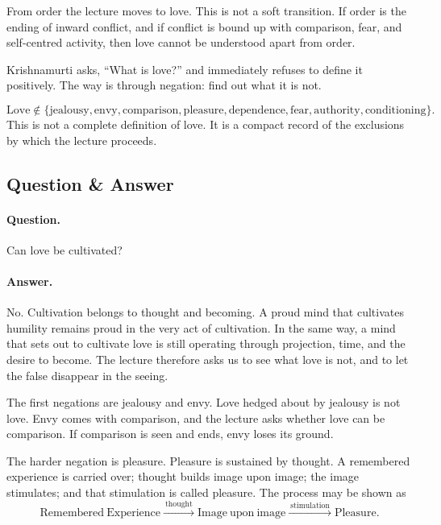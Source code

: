 From order the lecture moves to love. This is not a soft transition. If order is the ending of inward conflict, and if conflict is bound up with comparison, fear, and self-centred activity, then love cannot be understood apart from order.

Krishnamurti asks, ``What is love?'' and immediately refuses to define it positively. The way is through negation: find out what it is not.

\begin{equation}
\mathrm{Love} \notin
\{\mathrm{jealousy},\mathrm{envy},\mathrm{comparison},\mathrm{pleasure},
\mathrm{dependence},\mathrm{fear},\mathrm{authority},\mathrm{conditioning}\}.
\end{equation}
This is not a complete definition of love. It is a compact record of the exclusions by which the lecture proceeds.

\subsection{Question \& Answer}

\paragraph{Question.}
Can love be cultivated?

\paragraph{Answer.}
No. Cultivation belongs to thought and becoming. A proud mind that cultivates humility remains proud in the very act of cultivation. In the same way, a mind that sets out to cultivate love is still operating through projection, time, and the desire to become. The lecture therefore asks us to see what love is not, and to let the false disappear in the seeing.

The first negations are jealousy and envy. Love hedged about by jealousy is not love. Envy comes with comparison, and the lecture asks whether love can be comparison. If comparison is seen and ends, envy loses its ground.

The harder negation is pleasure. Pleasure is sustained by thought. A remembered experience is carried over; thought builds image upon image; the image stimulates; and that stimulation is called pleasure. The process may be shown as
\begin{equation}
\mathrm{Remembered\ Experience}
\xrightarrow{\ \mathrm{thought}\ }
\mathrm{Image\ upon\ image}
\xrightarrow{\ \mathrm{stimulation}\ }
\mathrm{Pleasure}.
\end{equation}

